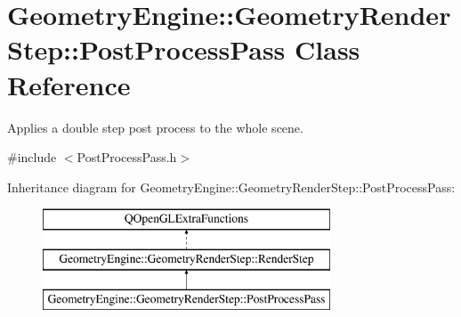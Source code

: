 \hypertarget{class_geometry_engine_1_1_geometry_render_step_1_1_post_process_pass}{}\section{Geometry\+Engine\+::Geometry\+Render\+Step\+::Post\+Process\+Pass Class Reference}
\label{class_geometry_engine_1_1_geometry_render_step_1_1_post_process_pass}


Applies a double step post process to the whole scene.  




{\ttfamily \#include $<$Post\+Process\+Pass.\+h$>$}

Inheritance diagram for Geometry\+Engine\+::Geometry\+Render\+Step\+::Post\+Process\+Pass\+:\begin{figure}[H]
\begin{center}
\leavevmode
\includegraphics[height=3.000000cm]{class_geometry_engine_1_1_geometry_render_step_1_1_post_process_pass}
\end{center}
\end{figure}
